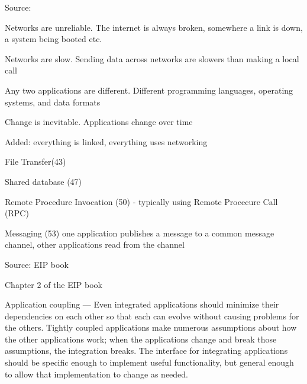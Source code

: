 \documentclass[Screen16to9,17pt]{foils}
\begin{document}
Source:\\





\begin{list2}
\item Networks are unreliable. The internet is always broken, somewhere a link is down, a system being booted etc.
\item Networks are slow. Sending data across networks are slowers than making a local call
\item Any two applications are different. Different programming languages, operating systems, and data formats
\item Change is inevitable. Applications change over time
\item Added: everything is linked, everything uses networking
\end{list2}


\begin{list2}
\item File Transfer(43)
\item Shared database (47)
\item Remote Procedure Invocation (50) - typically using Remote Procecure Call (RPC)
\item Messaging (53) one application publishes a message to a common message channel, other applications read from the channel
\end{list2}

Source: EIP book


\begin{list2}
\item Chapter 2 of the EIP book
\end{list2}


Application coupling — Even integrated applications should minimize their dependencies on each other so that each can evolve without causing problems for the others. Tightly coupled applications make numerous assumptions about how the other applications work; when the applications change and break those assumptions, the integration breaks. The interface for integrating applications should be specific enough to implement useful functionality, but general enough to allow that implementation to change as needed.
\end{document}
